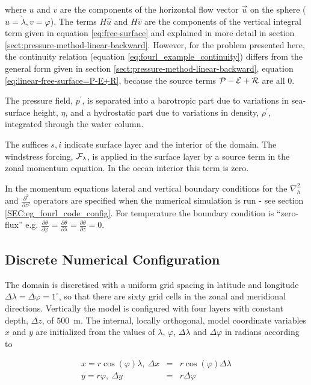 \noindent where $u$ and $v$ are the components of the horizontal
flow vector $\vec{u}$ on the sphere ($u=\dot{\lambda},v=\dot{\varphi}$).
The terms $H\widehat{u}$ and $H\widehat{v}$ are the components of the vertical
integral term given in equation \ref{eq:free-surface} and
explained in more detail in section \ref{sect:pressure-method-linear-backward}.
However, for the problem presented here, the continuity relation (equation
\ref{eq:fourl_example_continuity}) differs from the general form given
in section \ref{sect:pressure-method-linear-backward},
equation \ref{eq:linear-free-surface=P-E+R}, because the source terms
${\cal P}-{\cal E}+{\cal R}$ 
are all $0$.

The pressure field, $p^{\prime}$, is separated into a barotropic part
due to variations in sea-surface height, $\eta$, and a hydrostatic
part due to variations in density, $\rho^{\prime}$, integrated
through the water column.

The suffices ${s},{i}$ indicate surface layer and the interior of the domain.
The windstress forcing, ${\cal F}_{\lambda}$, is applied in the surface layer 
by a source term in the zonal momentum equation. In the ocean interior
this term is zero.

In the momentum equations
lateral and vertical boundary conditions for the $\nabla_{h}^{2}$
and $\frac{\partial^{2}}{\partial z^{2}}$ operators are specified
when the numerical simulation is run - see section 
\ref{SEC:eg_fourl_code_config}. For temperature
the boundary condition is ``zero-flux'' 
e.g. $\frac{\partial \theta}{\partial \varphi}=
\frac{\partial \theta}{\partial \lambda}=\frac{\partial \theta}{\partial z}=0$.



\subsection{Discrete Numerical Configuration}
\label{www:tutorials}

 The domain is discretised with 
a uniform grid spacing in latitude and longitude
 $\Delta \lambda=\Delta \varphi=1^{\circ}$, so 
that there are sixty grid cells in the zonal and meridional directions. 
Vertically the 
model is configured with four layers with constant depth, 
$\Delta z$, of $500$~m. The internal, locally orthogonal, model coordinate 
variables $x$ and $y$ are initialized from the values of
$\lambda$, $\varphi$, $\Delta \lambda$ and $\Delta \varphi$ in
radians according to

\begin{eqnarray}
x=r\cos(\varphi)\lambda,~\Delta x & = &r\cos(\varphi)\Delta \lambda \\
y=r\varphi,~\Delta y &= &r\Delta \varphi
\end{eqnarray}

